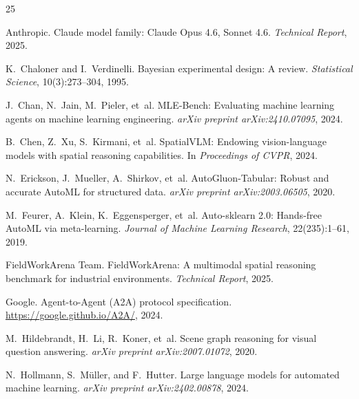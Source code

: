 \documentclass[11pt]{article}
\begin{document}
\small
\begin{thebibliography}{25}

Anthropic.
\newblock Claude model family: Claude Opus 4.6, Sonnet 4.6.
\newblock \emph{Technical Report}, 2025.

K.~Chaloner and I.~Verdinelli.
\newblock Bayesian experimental design: A review.
\newblock \emph{Statistical Science}, 10(3):273--304, 1995.

J.~Chan, N.~Jain, M.~Pieler, et~al.
\newblock MLE-Bench: Evaluating machine learning agents on machine learning engineering.
\newblock \emph{arXiv preprint arXiv:2410.07095}, 2024.

B.~Chen, Z.~Xu, S.~Kirmani, et~al.
\newblock SpatialVLM: Endowing vision-language models with spatial reasoning capabilities.
\newblock In \emph{Proceedings of CVPR}, 2024.

N.~Erickson, J.~Mueller, A.~Shirkov, et~al.
\newblock AutoGluon-Tabular: Robust and accurate AutoML for structured data.
\newblock \emph{arXiv preprint arXiv:2003.06505}, 2020.

M.~Feurer, A.~Klein, K.~Eggensperger, et~al.
\newblock Auto-sklearn 2.0: Hands-free AutoML via meta-learning.
\newblock \emph{Journal of Machine Learning Research}, 22(235):1--61, 2019.

FieldWorkArena Team.
\newblock FieldWorkArena: A multimodal spatial reasoning benchmark for industrial environments.
\newblock \emph{Technical Report}, 2025.

Google.
\newblock Agent-to-Agent (A2A) protocol specification.
\newblock \url{https://google.github.io/A2A/}, 2024.

M.~Hildebrandt, H.~Li, R.~Koner, et~al.
\newblock Scene graph reasoning for visual question answering.
\newblock \emph{arXiv preprint arXiv:2007.01072}, 2020.

N.~Hollmann, S.~M{\"u}ller, and F.~Hutter.
\newblock Large language models for automated machine learning.
\newblock \emph{arXiv preprint arXiv:2402.00878}, 2024.


\end{thebibliography}
\end{document}
